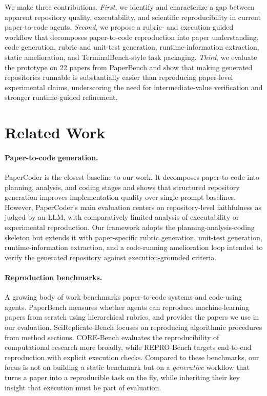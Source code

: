 \documentclass[11pt]{article}
\begin{document}
\noindent We make three contributions. \emph{First}, we identify and
characterize a gap between apparent repository quality, executability,
and scientific reproducibility in current paper-to-code agents.
\emph{Second}, we propose a rubric- and execution-guided workflow that
decomposes paper-to-code reproduction into paper understanding, code
generation, rubric and unit-test generation, runtime-information
extraction, static amelioration, and TerminalBench-style task
packaging. \emph{Third}, we evaluate the prototype on 22 papers from
PaperBench \citep{starace2025paperbench} and show that making
generated repositories runnable is substantially easier than
reproducing paper-level experimental claims, underscoring the need
for intermediate-value verification and stronger runtime-guided
refinement.
\section{Related Work}

\paragraph{Paper-to-code generation.} PaperCoder
\citep{seo2025papercoder} is the closest baseline to our work.
It decomposes paper-to-code into planning, analysis, and coding
stages and shows that structured repository generation
improves implementation quality over single-prompt baselines.
However, PaperCoder's main evaluation centers on repository-level
faithfulness as judged by an LLM, with comparatively limited
analysis of executability or experimental reproduction. Our
framework adopts the planning-analysis-coding skeleton but
extends it with paper-specific rubric generation, unit-test
generation, runtime-information extraction, and a code-running
amelioration loop intended to verify the generated repository
against execution-grounded criteria.

\paragraph{Reproduction benchmarks.} A growing body of work
benchmarks paper-to-code systems and code-using agents.
PaperBench \citep{starace2025paperbench} measures whether agents
can reproduce machine-learning papers from scratch using
hierarchical rubrics, and provides the papers we use in our
evaluation. SciReplicate-Bench
\citep{scireplicate2024} focuses on reproducing
algorithmic procedures from method sections.
CORE-Bench \citep{corebench2024} evaluates the reproducibility
of computational research more broadly, while REPRO-Bench
\citep{hu2025reprobench} targets end-to-end reproduction with
explicit execution checks. Compared to these benchmarks, our
focus is not on building a static benchmark but on a
\emph{generative} workflow that turns a paper into a reproducible
task on the fly, while inheriting their key insight that
execution must be part of evaluation.
\end{document}
